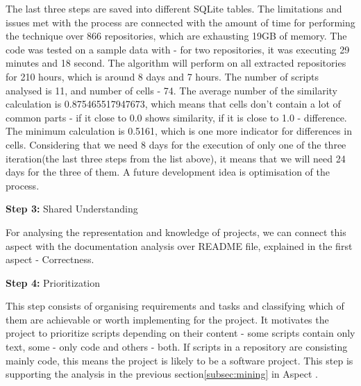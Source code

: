 The last three steps are saved into different SQLite\cite{sqlite3} tables. The limitations and issues met with the process are connected with the amount of time for performing the technique over 866 repositories, which are exhausting 19GB of memory. The code was tested on a sample data with - for two repositories, it was executing 29 minutes and 18 second. The algorithm will perform on all extracted repositories for 210 hours, which is around 8 days and 7 hours. The number of scripts analysed is 11, and number of cells - 74. The average number of the similarity calculation is 0.875465517947673, which means that cells don't contain a lot of common parts - if it close to 0.0 shows similarity, if it is close to 1.0 - difference. The minimum calculation is 0.5161, which is one more indicator for differences in cells. Considering that we need 8 days for the execution of only one of the three iteration(the last three steps from the list above), it means that we will need 24 days for the three of them. A future development idea is optimisation of the process. 


\vspace{5mm}
\begin{mdframed}
\vspace{1px}
\textbf{Step 3:} Shared Understanding
\vspace{1px}
\end{mdframed}
\vspace{2mm}

For analysing the representation and knowledge of projects, we can connect this aspect with the documentation analysis over README file, explained in the first aspect - Correctness.


\vspace{5mm}
\begin{mdframed}
\vspace{1px}
\textbf{Step 4:} Prioritization
\vspace{1px}
\end{mdframed}
\vspace{2mm}

This step consists of organising requirements and tasks and classifying which of them are achievable or worth
implementing for the project. It motivates the project to prioritize scripts depending on their content - some scripts contain only text, some - only code and others - both. If scripts in a repository are consisting mainly code, this means the project is likely to be a software project. This step is supporting the analysis in the previous section\ref{subsec:mining} in Aspect . 

